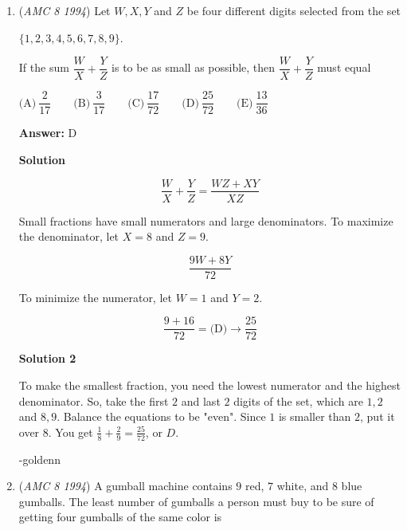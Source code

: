 \begin{enumerate}
 \textbf{Answer: }E



\textbf{Solution}

The radius of each semicircle is $2$, half the sidelength of the square. The line straight down the middle of square $ABCD$ is the sum of two radii and the length of the smaller square, which is equivalent to its side length. The area of $ABCD$ is $(4+2+2)^2 = \boxed{\text{(E)}\ 64}$.

 


	\item (\textit{AMC 8 1994}) Let $W,X,Y$ and $Z$ be four different digits selected from the set


 $\{ 1,2,3,4,5,6,7,8,9\}.$

 If the sum $\dfrac{W}{X} + \dfrac{Y}{Z}$ is to be as small as possible, then $\dfrac{W}{X} + \dfrac{Y}{Z}$ must equal


 $\text{(A)}\ \dfrac{2}{17} \qquad \text{(B)}\ \dfrac{3}{17} \qquad \text{(C)}\ \dfrac{17}{72} \qquad \text{(D)}\ \dfrac{25}{72} \qquad \text{(E)}\ \dfrac{13}{36}$

 \textbf{Answer: }D



\textbf{Solution}


 \[\frac{W}{X} + \frac{Y}{Z} = \frac{WZ+XY}{XZ}\]

 Small fractions have small numerators and large denominators. To maximize the denominator, let $X=8$ and $Z=9$.

 
 \[\frac{9W+8Y}{72}\]

 To minimize the numerator, let $W=1$ and $Y=2$.

 
 \[\frac{9+16}{72} = \boxed{\text{(D)}\rightarrow \frac{25}{72}}\]




\textbf{Solution 2}

To make the smallest fraction, you need the lowest numerator and the highest denominator. So, take the first $2$ and last $2$ digits of the set, which are $1,2$ and $8,9$. Balance the equations to be "even". Since $1$ is smaller than $2$, put it over $8$. You get $\frac{1}{8}+\frac{2}{9}=\frac{25}{72}$, or $\boxed{D}$.

 -goldenn

 


	\item (\textit{AMC 8 1994}) A gumball machine contains $9$ red, $7$ white, and $8$ blue gumballs.  The least number of gumballs a person must buy to be sure of getting four gumballs of the same color is



\end{enumerate}
